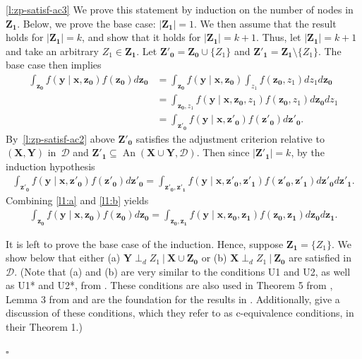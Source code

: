 \documentclass[11pt,a4paper]{article}
\newcommand\given[1][]{\:#1\vert\:}
\newcommand{\dsepp}{\perp_{d}}
\newenvironment{proofof}[1][]{\begin{trivlist}
   \item[\hskip \labelsep {\bfseries Proof of #1.}]}{\hfill{}$\square$\end{trivlist}}
\DeclareMathOperator{\An}{An}
\newcommand{\g}[1][G]{\mathcal{#1}}
\begin{document}
\begin{proofof}[Lemma~\ref{lemma:zprime satisfies ac}]
\ref{l:zp-satisf-ac3} We prove this statement by induction on the number of nodes in $\mathbf{Z_1}$. Below, we prove the base case: $|\mathbf{Z_1}| = 1$. We then assume that the result holds for $|\mathbf{Z_1}| = k$, and show that it holds for $|\mathbf{Z_1}| = k+1$. Thus, let $|\mathbf{Z_1}| = k+1$ and take an arbitrary $Z_1 \in \mathbf{Z_1}$. Let $\mathbf{Z'_0} = \mathbf{Z_0} \cup \{Z_1\}$ and $\mathbf{Z'_1} = \mathbf{Z_1} \setminus \{Z_1\}$. The base case then implies
\begin{align}
\int_\mathbf{z_0} f(\mathbf{y} \mid \mathbf{x,z_0})f(\mathbf{z_0}) d\mathbf{z_0}
&= \int_{\mathbf{z_0}} f(\mathbf{y} \mid \mathbf{x,z_0}) \int_{z_1} f(\mathbf{z_0},z_1) dz_1d\mathbf{z_0}  \nonumber \\
&= \int_{\mathbf{z_0},z_1} f(\mathbf{y} \mid \mathbf{x,z_0},z_1) f(\mathbf{z_0},z_1) d\mathbf{z_0}dz_1 \nonumber \\
&= \int_{\mathbf{z'_0}} f(\mathbf{y} \mid \mathbf{x,z'_0}) f(\mathbf{z'_0}) d\mathbf{z'_0}. \label{l1:a}
\end{align}
By~\ref{l:zp-satisf-ac2} above $\mathbf{Z'_0}$ satisfies the adjustment criterion relative to $(\mathbf{X,Y})$ in~$\g[D]$ and $ \mathbf{Z'_1} \subseteq \An(\mathbf{X} \cup \mathbf{Y}, \g[D])$. Then since $|\mathbf{Z'_1}| = k$, by the induction hypothesis
\begin{align}
\int_\mathbf{z'_0} f(\mathbf{y} \mid \mathbf{x,z'_0})f(\mathbf{z'_0}) d\mathbf{z'_0}
= \int_{\mathbf{z'_0,z'_1}} f(\mathbf{y} \mid \mathbf{x,z'_0,z'_1}) f(\mathbf{z'_0,z'_1}) d\mathbf{z'_0}d\mathbf{z'_1}. \label{l1:b}
\end{align}
Combining \ref{l1:a} and \ref{l1:b} yields
\begin{align}
\int_\mathbf{z_0} f(\mathbf{y} \mid \mathbf{x,z_0})f(\mathbf{z_0}) d\mathbf{z_0}
= \int_{\mathbf{z_0,z_1}} f(\mathbf{y} \mid \mathbf{x,z_0,z_1}) f(\mathbf{z_0,z_1}) d\mathbf{z_0}d\mathbf{z_1}. \nonumber
\end{align}

It is left to prove the base case of the induction. Hence, suppose $\mathbf{Z_1} = \{Z_1 \}$.
We show below that either (a) $\mathbf{Y} \dsepp Z_1 \given \mathbf{X} \cup \mathbf{Z_0}$ or (b) $\mathbf{X} \dsepp Z_1 \given \mathbf{Z_0}$ are satisfied in~$\g[D]$. 
(Note that (a) and (b) are very similar to the conditions U1 and U2, as well as U1* and U2*, from \citealp{greenland1999causal}. These conditions are also used in Theorem 5 from \citealp{kuroki2003covariate}, Lemma 3 from \citealp{kuroki04selection} and are the foundation for the results in \citealp{DeLunaEtAl11}. Additionally, \citealp{pearl2014confounding} give a discussion of these conditions, which they refer to as c-equivalence conditions, in their Theorem 1.)


\end{proofof}
\end{document}
